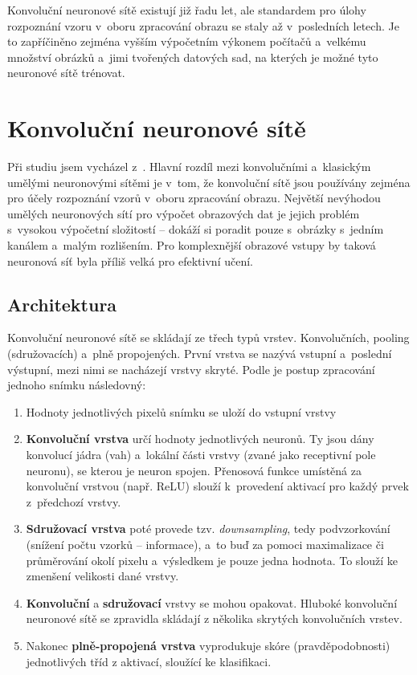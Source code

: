Konvoluční neuronové sítě existují již řadu let, ale standardem pro úlohy rozpoznání vzoru v~oboru zpracování obrazu se staly až v~posledních letech. Je to zapříčiněno zejména vyšším výpočetním výkonem počítačů a~velkému množství obrázků a~jimi tvořených datových sad, na kterých je možné tyto neuronové sítě trénovat.


\section{Konvoluční neuronové sítě}
\label{cnnTeorie}
Při studiu jsem vycházel z~\cite{CNN, CVmodernApproach}. Hlavní rozdíl mezi konvolučními a~klasickým umělými neuronovými sítěmi je v~tom, že konvoluční sítě jsou používány zejména pro účely rozpoznání vzorů v~oboru zpracování obrazu. Největší nevýhodou umělých neuronových sítí pro výpočet obrazových dat je jejich problém s~vysokou výpočetní složitostí -- dokáží si poradit pouze s~obrázky s~jedním kanálem a~malým rozlišením. Pro komplexnější obrazové vstupy by taková neuronová síť byla příliš velká pro efektivní učení.

\subsection*{Architektura}
Konvoluční neuronové sítě se skládají ze třech typů vrstev. Konvolučních, pooling (sdružovacích) a~plně propojených. První vrstva se nazývá vstupní a~poslední výstupní, mezi nimi se nacházejí vrstvy skryté. Podle \cite{CNN} je postup zpracování jednoho snímku následovný:

\begin{enumerate}
	\item Hodnoty jednotlivých pixelů snímku se uloží do vstupní vrstvy
	\item \textbf{Konvoluční vrstva} určí hodnoty jednotlivých neuronů. Ty jsou dány konvolucí jádra (vah) a~lokální části vrstvy (zvané jako receptivní pole neuronu), se kterou je neuron spojen. Přenosová funkce umístěná za konvoluční vrstvou (např. ReLU\footnotemark) slouží k~provedení aktivací pro každý prvek z~předchozí vrstvy.
	\item \textbf{Sdružovací vrstva} poté provede tzv. \emph{downsampling}, tedy podvzorkování (snížení počtu vzorků -- informace), a~to buď za pomoci maximalizace či průměrování okolí pixelu a~výsledkem je pouze jedna hodnota. To slouží ke zmenšení velikosti dané vrstvy.
	\item \textbf{Konvoluční} a \textbf{sdružovací} vrstvy se mohou opakovat. Hluboké konvoluční neuronové sítě se zpravidla skládají z několika skrytých konvolučních vrstev.
	\item Nakonec \textbf{plně-propojená vrstva} vyprodukuje skóre (pravděpodobnosti) jednotlivých tříd z aktivací, sloužící ke klasifikaci.
\end{enumerate}

